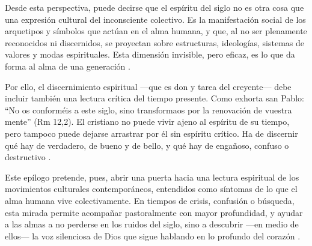 Desde esta perspectiva, puede decirse que el espíritu del siglo no es otra cosa que una expresión cultural del inconsciente colectivo. Es la manifestación social de los arquetipos y símbolos que actúan en el alma humana, y que, al no ser plenamente reconocidos ni discernidos, se proyectan sobre estructuras, ideologías, sistemas de valores y modas espirituales. Esta dimensión invisible, pero eficaz, es lo que da forma al alma de una generación \cite{jung1959}.

Por ello, el discernimiento espiritual —que es don y tarea del creyente— debe incluir también una lectura crítica del tiempo presente. Como exhorta san Pablo: “No os conforméis a este siglo, sino transformaos por la renovación de vuestra mente” (Rm 12,2). El cristiano no puede vivir ajeno al espíritu de su tiempo, pero tampoco puede dejarse arrastrar por él sin espíritu crítico. Ha de discernir qué hay de verdadero, de bueno y de bello, y qué hay de engañoso, confuso o destructivo \cite{jung1959}.

Este epílogo pretende, pues, abrir una puerta hacia una lectura espiritual de los movimientos culturales contemporáneos, entendidos como síntomas de lo que el alma humana vive colectivamente. En tiempos de crisis, confusión o búsqueda, esta mirada permite acompañar pastoralmente con mayor profundidad, y ayudar a las almas a no perderse en los ruidos del siglo, sino a descubrir —en medio de ellos— la voz silenciosa de Dios que sigue hablando en lo profundo del corazón \cite{jung1959}.





